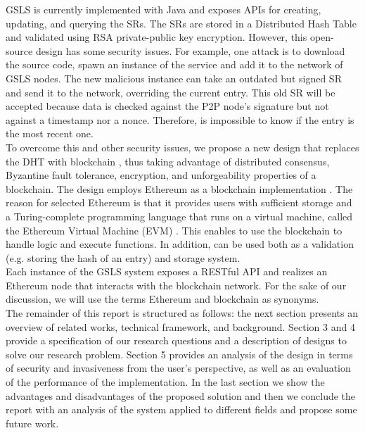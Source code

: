 GSLS is currently implemented with Java and exposes APIs for creating, updating, and querying the SRs. The SRs are stored in a Distributed Hash Table \cite{tomp2p_2009} and validated using RSA private-public key encryption. However, this open-source design has some security issues. For example, one attack is to download the source code, spawn an instance of the service and add it to the network of GSLS nodes. The new malicious instance can take an outdated but signed SR and send it to the network, overriding the current entry. This old SR will be accepted because data is checked against the P2P node's signature but not against a timestamp nor a nonce. Therefore, is impossible to know if the entry is the most recent one. 
\\

To overcome this and other security issues, we propose a new design that replaces the DHT with blockchain \cite{nakamoto_bitcoin_2008}, thus taking advantage of distributed consensus, Byzantine fault tolerance, encryption, and unforgeability properties of a blockchain. The design employs Ethereum as a blockchain implementation \cite{wood_ethereum_2014}. The reason for selected Ethereum is that it provides users with sufficient storage and a Turing-complete programming language that runs on a virtual machine, called the Ethereum Virtual Machine (EVM) \cite{wood_ethereum_2014}. This enables to use the blockchain to handle logic and execute functions. In addition, can be used both as a validation (e.g. storing the hash of an entry) and storage system. 
\\

Each instance of the GSLS system exposes a RESTful API and realizes an Ethereum node that interacts with the blockchain network. For the sake of our discussion, we will use the terms Ethereum and blockchain as synonyms.
\\

The remainder of this report is structured as follows: the next section presents an overview of related works, technical framework, and background. Section 3 and 4 provide a specification of our research questions and a description of designs to solve our research problem. Section 5 provides an analysis of the design in terms of security and invasiveness from the user's perspective, as well as an evaluation of the performance of the implementation. In the last section we show the advantages and disadvantages of the proposed solution and then we conclude the report with an analysis of the system applied to different fields and propose some future work. 
